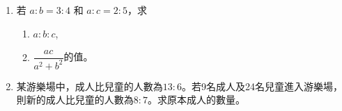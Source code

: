 \documentclass[11pt]{article}
\begin{document}
\begin{enumerate}
            \hrulefill
            
            \hrulefill
            
            \hrulefill

        \item 若 $a:b=3:4$ 和 $a:c=2:5$，求\begin{enumerate}
            \item $a:b:c$,
            \item $\dfrac{ac}{a^2+b^2}$的值。
        \end{enumerate}

        \hrulefill

            \hrulefill
            
            \hrulefill
            
            \hrulefill
            
            \hrulefill
            
            \hrulefill
            
            \hrulefill
            
            \hrulefill
            
            \hrulefill
            
            \hrulefill
            
            \hrulefill
            
            \hrulefill

        \pagebreak
        \item 某游樂場中，成人比兒童的人數為$13:6$。若9名成人及24名兒童進入游樂場，則新的成人比兒童的人數為$8:7$。求原本成人的數量。
        
        \hrulefill

            \hrulefill
            
            \hrulefill
            
            \hrulefill
            
            \hrulefill
            
            \hrulefill
            
            \hrulefill
            
            \hrulefill
            
            \hrulefill
            
            \hrulefill
            
            \hrulefill
            
            \hrulefill


\end{enumerate}
\end{document}
